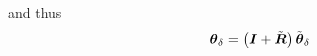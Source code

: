 \documentclass[10pt,dvips,fleqn]{report}
\newcommand{\T}[1]{\boldsymbol{#1}}
\newcommand{\equu}{\overset{\mathrm{uu}}{=}}
\begin{document}
and thus
\begin{equation}
	\T{\theta}_{\delta} = \plbr{\T{I} + \tilde{\T{R}}} \tilde{\T{\theta}}_{\delta}
\end{equation}
\begin{comment}
\begin{align}
	\tilde{\T{\theta}}_{\delta}
	&= \frac{1}{2} \T{\theta}_{\delta} \\
	&= \frac{1}{2} \T{R}_{1h}^T \plbr{\T{\theta}_{2\delta} - \T{\theta}_{1\delta}} \\
	&\equu \frac{1}{2} \T{R}_{1h}^T \plbr{\delta\T{g}_2 - \delta\T{g}_1}
\end{align}
while the perturbation of $\hat{\T{R}}$ yields
\begin{align}
	\delta\hat{\T{R}}
	&= \delta\T{R}_{1h} \tilde{\T{R}} + \T{R}_{1h} \delta\tilde{\T{R}} \\
	&= \T{\theta}_{1\delta} \times \hat{\T{R}}
		+ \frac{1}{2}\plbr{\T{\theta}_{2\delta} - \T{\theta}_{1\delta}} \times \hat{\T{R}} \\
	&= \frac{1}{2}\plbr{\T{\theta}_{2\delta} + \T{\theta}_{1\delta}} \times \hat{\T{R}}
\end{align}
\begin{eqnarray*}
	\tilde{\T{\theta}}_{\delta} & = & \frac{1}{2}\T{\Gamma}\plbr{\tilde{\T{\theta}}}
		\T{\Gamma}\plbr{\T{\theta}}^{-1} \T{R}_{1h}^T\plbr{\T{\theta}_{2\delta} - \T{\theta}_{1\delta}} \\
	& \equu & \frac{1}{2}\T{\Gamma}\plbr{\tilde{\T{\theta}}}
		\T{\Gamma}\plbr{\T{\theta}}^{-1} \T{R}_{1h}^T\plbr{\delta\T{g}_2 - \delta\T{g}_1}
\end{eqnarray*}
The perturbation of $\dot{\tilde{\T{R}}}$ is
\begin{eqnarray*}
	\delta\dot{\tilde{\T{R}}}
	& = & \frac{1}{2}\plbr{\delta\T{\omega}_2 - \delta\T{\omega}_1}\times\tilde{\T{R}}
	+ \frac{1}{2}\plbr{\T{\omega}_2 - \T{\omega}_1}\times\delta\tilde{\T{R}} \\
	& \equu & \frac{1}{2}\plbr{
		\delta\dot{\T{g}}_2 - \T{\omega}_2\times\delta\T{g}_2
		- \delta\dot{\T{g}}_1 + \T{\omega}_1\times\delta\T{g}_1
	}\times\tilde{\T{R}}
	+ \frac{1}{2}\plbr{\T{\omega}_2 - \T{\omega}_1}\times\delta\tilde{\T{R}}
\end{eqnarray*}
The perturbation of $\dot{\hat{\T{R}}}$ is
\begin{eqnarray*}
	\delta\dot{\hat{\T{R}}}
	& = & \frac{1}{2}\plbr{\delta\T{\omega}_2 + \delta\T{\omega}_1}\times\hat{\T{R}}
	+ \frac{1}{2}\plbr{\T{\omega}_2 + \T{\omega}_1}\times\delta\hat{\T{R}} \\

\end{comment}
\end{document}
